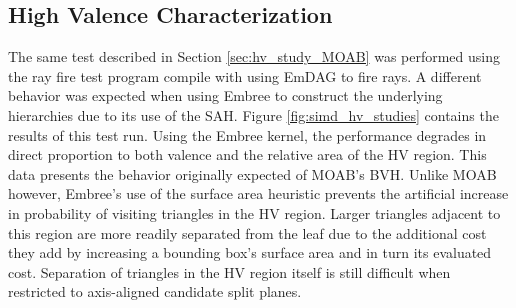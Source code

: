 

\subsection{High Valence Characterization}

The same test described in Section \ref{sec:hv_study_MOAB} was performed using
the ray fire test program compile with using EmDAG to fire rays. A different
behavior was expected when using Embree to construct the underlying hierarchies
due to its use of the SAH. Figure \ref{fig:simd_hv_studies} contains the results
of this test run. Using the Embree kernel, the performance degrades in direct
proportion to both valence and the relative area of the HV region. This data
presents the behavior originally expected of MOAB's BVH. Unlike MOAB however,
Embree's use of the surface area heuristic prevents the artificial increase in
probability of visiting triangles in the HV region. Larger triangles adjacent to
this region are more readily separated from the leaf due to the additional cost
they add by increasing a bounding box's surface area and in turn its evaluated
cost. Separation of triangles in the HV region itself is still difficult when
restricted to axis-aligned candidate split planes.

